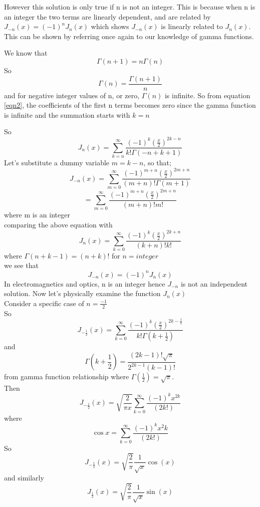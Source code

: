 However this solution is only true if n is not an integer. This is because when n is an integer the two terms are linearly dependent, and are related by $ J_{-n}(x) = (-1)^n J_n(x)$ which shows $J_{-n}(x)$ is linearly related to $ J_n(x).$ This can be shown by referring once again to our knowledge of gamma functions.

We know that $$\Gamma(n + 1) = n \Gamma(n)$$
So 	$$\Gamma(n) = \frac{\Gamma(n + 1)}{n} $$
and for negative integer values of n, or zero, $\Gamma(n)$ is infinite. So from equation \ref{eqn2}, the coefficients of the first n terms becomes zero since the gamma function is infinite and the summation starts with $k=n$

So 	$$J_n(x) = \sum_{k = n}^{\infty}\frac{(-1)^k (\frac{x}{2})^{2k - n}}{k! \Gamma(-n + k + 1)}$$
Let's substitute a dummy variable $m= k - n$, so that;
$$J_{-n}(x) = \sum_{m = 0}^{\infty}\frac{(-1)^{m + n} (\frac{x}{2})^{2m + n}}{(m + n)! \Gamma(m + 1)}$$
$$= \sum_{m = 0}^{\infty}\frac{(-1)^{m + n} (\frac{x}{2})^{2m + n}}{(m + n)! m!}$$ where m is an integer\\
comparing the above equation with
$$J_n(x) = \sum_{k = 0}^{\infty}\frac{(-1)^k (\frac{x}{2})^{2k + n}}{(k + n)! k!}$$ where $\Gamma(n + k - 1)=(n + k)!$ for $n= integer$\\
we see that $$J_{-n}(x) = (-1)^n J_n(x)$$
In electromagnetics and optics, n is an integer hence $J_{-n}$ is not an independent solution. Now let's physically examine the function $J_n(x)$ \\
Consider a specific case of $n = \frac{-1}{2}$
\\
So $$J_{-\frac{1}{2}}(x) = \sum_{k = 0}^{\infty}\frac{(-1)^k (\frac{x}{2})^{2k - \frac{1}{2}}}{k! \Gamma( k + \frac{1}{2})}$$
and $$\Gamma( k + \frac{1}{2}) = \frac{(2k - 1)! \sqrt{\pi}}{2^{2k - 1}(k - 1)!}$$
from gamma function relationship where $\Gamma(\frac{1}{2}) = \sqrt{\pi}$.\\
Then
$$J_{-\frac{1}{2}}(x) = \sqrt{\frac{2}{\pi x}}\sum_{k = 0}^{\infty}\frac{(-1)^k x^{2k}}{(2k!)}$$
where $$\cos x =\sum_{k = 0}^{\infty}\frac{(-1)^k x^2k}{(2k!)}$$
So $$J_{-\frac{1}{2}}(x) = \sqrt{\frac{2}{\pi}}\frac{1}{\sqrt{x}}\cos(x)$$
and similarly $$J_{\frac{1}{2}}(x) = \sqrt{\frac{2}{\pi}}\frac{1}{\sqrt{x}}\sin(x)$$


